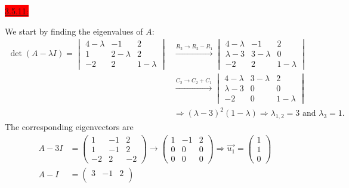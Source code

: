 \documentclass{exam}
\begin{document}
\colorbox{red}{\underline{3.5.11:}}
\begin{solution}
    We start by finding the eigenvalues of $A$: 
    \begin{align*}
        \det(A - \lambda I) = \begin{vmatrix}
            4 - \lambda & -1 & 2 \\
            1 & 2 - \lambda & 2 \\
            -2 & 2 & 1 - \lambda
        \end{vmatrix}
        &\xrightarrow{R_2 \to R_2 - R_1}
        \begin{vmatrix}
            4 - \lambda & -1 & 2 \\
            \lambda - 3 & 3 - \lambda & 0 \\
            -2 & 2 & 1 - \lambda
        \end{vmatrix} \\
        &\xrightarrow{C_2 \to C_2 + C_1}
        \begin{vmatrix}
            4 - \lambda & 3-\lambda & 2 \\
            \lambda - 3 & 0 & 0 \\
            -2 & 0 & 1 - \lambda
        \end{vmatrix} \\
        &\Rightarrow (\lambda - 3)^2(1 - \lambda) \Rightarrow \lambda_{1, 2} = 3 \text{ and } \lambda_3 = 1.
    \end{align*}    
    The corresponding eigenvectors are 
    \begin{align*}
        A - 3I &= \begin{pmatrix}
            1 & -1 & 2 \\
            1 & -1 & 2 \\
            -2 & 2 & -2 
        \end{pmatrix}
        \to
        \begin{pmatrix}
            1 & -1 & 2 \\
            0 & 0 & 0 \\
            0 & 0 & 0
        \end{pmatrix}
        \Rightarrow \vec{u_1} = \begin{pmatrix}
            1 \\ 1 \\ 0
        \end{pmatrix} \\
        A - I &= \begin{pmatrix}
            3 & -1 & 2 \\

\end{pmatrix}
\end{align*}
\end{solution}
\end{document}

